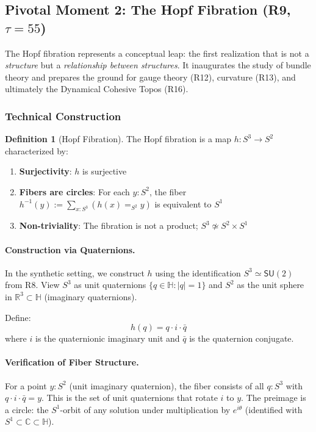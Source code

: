 \documentclass[11pt]{article}
\theoremstyle{definition}
\newtheorem{definition}[theorem]{Definition}
\begin{document}
\subsection{Pivotal Moment 2: The Hopf Fibration (R9, $\tau=55$)}

The Hopf fibration represents a conceptual leap: the first realization that is not a \emph{structure} but a \emph{relationship between structures}. It inaugurates the study of bundle theory and prepares the ground for gauge theory (R12), curvature (R13), and ultimately the Dynamical Cohesive Topos (R16).

\subsubsection{Technical Construction}

\begin{definition}[Hopf Fibration]
\label{def:hopf}
The Hopf fibration is a map $h : S^3 \to S^2$ characterized by:
\begin{enumerate}
\item \textbf{Surjectivity}: $h$ is surjective
\item \textbf{Fibers are circles}: For each $y : S^2$, the fiber $h^{-1}(y) := \sum_{x : S^3} (h(x) =_{S^2} y)$ is equivalent to $S^1$
\item \textbf{Non-triviality}: The fibration is not a product; $S^3 \not\simeq S^2 \times S^1$
\end{enumerate}
\end{definition}

\paragraph{Construction via Quaternions.}

In the synthetic setting, we construct $h$ using the identification $S^3 \simeq \mathsf{SU}(2)$ from R8. View $S^3$ as unit quaternions $\{q \in \mathbb{H} : |q| = 1\}$ and $S^2$ as the unit sphere in $\mathbb{R}^3 \subset \mathbb{H}$ (imaginary quaternions).

Define:
\[
h(q) = q \cdot i \cdot \bar{q}
\]
where $i$ is the quaternionic imaginary unit and $\bar{q}$ is the quaternion conjugate.

\paragraph{Verification of Fiber Structure.}

For a point $y : S^2$ (unit imaginary quaternion), the fiber consists of all $q : S^3$ with $q \cdot i \cdot \bar{q} = y$. This is the set of unit quaternions that rotate $i$ to $y$. The preimage is a circle: the $S^1$-orbit of any solution under multiplication by $e^{i\theta}$ (identified with $S^1 \subset \mathbb{C} \subset \mathbb{H}$).
\end{document}
